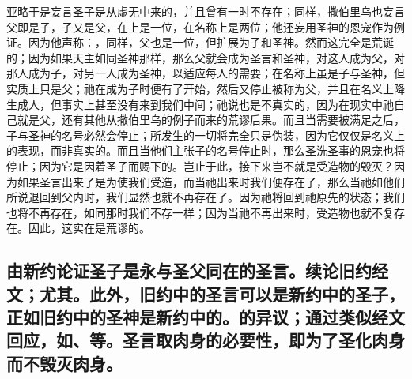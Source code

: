 亚略于是妄言圣子是从虚无中来的，并且曾有一时不存在；同样，撒伯里乌也妄言父即是子，子又是父，在上是一位，在名称上是两位；他还妄用圣神的恩宠作为例证。因为他声称：，同样，父也是一位，但扩展为子和圣神。然而这完全是荒诞的；因为如果天主如同圣神那样，那么父就会成为圣言和圣神，对这人成为父，对那人成为子，对另一人成为圣神，以适应每人的需要；在名称上虽是子与圣神，但实质上只是父；祂在成为子时便有了开始，然后又停止被称为父，并且在名义上降生成人，但事实上甚至没有来到我们中间；祂说也是不真实的，因为在现实中祂自己就是父，还有其他从撒伯里乌的例子而来的荒谬后果。而且当需要被满足之后，子与圣神的名号必然会停止；所发生的一切将完全只是伪装，因为它仅仅是名义上的表现，而非真实的。而且当他们主张子的名号停止时，那么圣洗圣事的恩宠也将停止；因为它是因着圣子而赐下的。岂止于此，接下来岂不就是受造物的毁灭？因为如果圣言出来了是为使我们受造，而当祂出来时我们便存在了，那么当祂如他们所说退回到父内时，我们显然也就不再存在了。因为祂将回到祂原先的状态；我们也将不再存在，如同那时我们不存一样；因为当祂不再出来时，受造物也就不复存在。因此，这实在是荒谬的。\par


\subsection{由新约论证圣子是永与圣父同在的圣言。续论旧约经文；尤其。此外，旧约中的圣言可以是新约中的圣子，正如旧约中的圣神是新约中的。的异议；通过类似经文回应，如、等。圣言取肉身的必要性，即为了圣化肉身而不毁灭肉身。}

